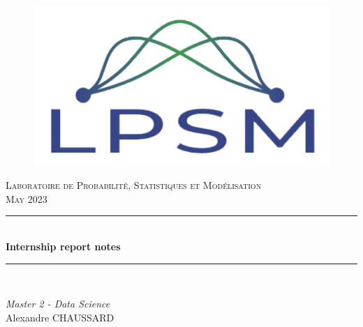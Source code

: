 \newcommand{\HRule}{\rule{\linewidth}{0.5mm}} 		
\begin{titlepage}
    \begin{center}

        \center 
        \begin{figure}[H]
            \centering
            \includegraphics[scale=.4]{images/logo_lpsm}
            \label{fig:logo_lab}
        \end{figure}
        
        \textsc{Laboratoire de Probabilité, Statistiques et Modélisation}\\[0.5cm]
        \textsc{\large May 2023}\\[2cm] 
        
        \HRule \\[1cm]
        { \huge \bfseries Internship report notes}\\[1cm]			
        \HRule \\[.5cm]
        \large

        \vspace*{1cm}
        
        \emph{Master 2 - Data Science} \\[1cm]

        Alexandre CHAUSSARD  \\ [0.5cm]
    \end{center}
\end{titlepage}

\newpage


\newpage
\tableofcontents
\newpage